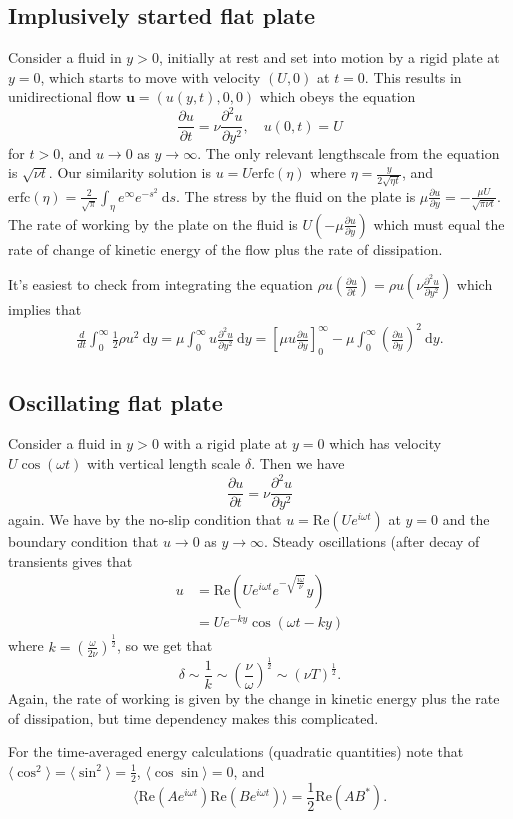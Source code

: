 \documentclass{article}
\begin{document}
\subsection{Implusively started flat plate}
Consider a fluid in $ y>0 $, initially at rest and set into motion by a rigid plate at $ y=0 $, which starts to move with velocity $ (U,0) $ at $ t=0 $. This results in unidirectional flow $ \mathbf u = (u(y,t),0,0) $ which obeys the equation
\[
	\frac{\partial u}{\partial t} = \nu \frac{\partial^2 u}{\partial y^2},\quad u(0,t) = U
\]
for $ t>0 $, and $ u\to 0 $ as $ y\to \infty $. The only relevant lengthscale from the equation is $ \sqrt{\nu t} $. Our similarity solution is $ u = U\mathrm{erfc}(\eta) $ where $ \eta = \frac{y}{2\sqrt{\eta t}} $, and $ \mathrm{erfc}(\eta) = \frac 2{\sqrt \pi} \int_{\eta}e^\infty e^{-s^2} \ \mathrm ds $. The stress by the fluid on the plate is $ \mu\frac{\partial u}{\partial y} = -\frac{\mu U}{\sqrt{\pi \nu t}} $. The rate of working by the plate on the fluid is $ U\left(-\mu \frac{\partial u}{\partial y}\right) $ which must equal the rate of change of kinetic energy of the flow plus the rate of dissipation. \par
It's easiest to check from integrating the equation $ \rho u \left(\frac{\partial u}{\partial t}\right) = \rho u\left(\nu \frac{\partial^2 u}{\partial y^2}\right) $ which implies that
\begin{align*}
	\frac{d}{dt}\int_0^\infty \frac 12 \rho u^2 \ \mathrm dy = \mu \int_0^\infty u \frac{\partial^2 u}{\partial y^2}\ \mathrm dy = \left[ \mu u \frac{\partial u}{\partial y}\right]^\infty_0 - \mu \int_0^\infty \left(\frac{\partial u}{\partial y}\right)^2 \ \mathrm dy.
\end{align*}
\subsection{Oscillating flat plate}
Consider a fluid in $ y>0 $ with a rigid plate at $ y=0 $ which has velocity $ U\cos(\omega t) $ with vertical length scale $ \delta $. Then we have 
\[
	\frac{\partial u}{\partial t} = \nu \frac{\partial^2 u}{\partial y^2}
\]
again. We have by the no-slip condition that $ u = \mathrm{Re}(Ue^{i\omega t}) $ at $ y=0 $ and the boundary condition that $ u\to 0 $ as $ y\to\infty $. Steady oscillations (after decay of transients gives that
\begin{align*}
	u &=\mathrm{Re}\left(Ue^{i\omega t}e^{-\sqrt{\frac{i\omega}\nu}}y\right) \\
	  &= U e^{-ky} \cos(\omega t- ky)
\end{align*}
where $ k = \left(\frac{\omega}{2\nu}\right)^{\frac 12} $, so we get that
\[
	\delta \sim \frac 1k \sim \left(\frac {\nu}\omega\right)^{\frac 12} \sim (\nu T)^{\frac 12}.
\]
Again, the rate of working is given by the change in kinetic energy plus the rate of dissipation, but time dependency makes this complicated.\par
For the time-averaged energy calculations (quadratic quantities) note that $ \langle \cos^2\rangle = \langle \sin^2\rangle = \frac 12 $, $ \langle \cos\sin\rangle = 0 $, and
\[
	\langle \mathrm{Re}(Ae^{i\omega t})\mathrm{Re}(Be^{i\omega t})\rangle = \frac 12 \mathrm{Re}(AB^*).
\]
\end{document}
